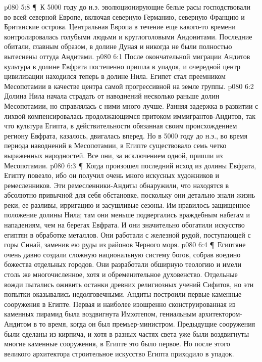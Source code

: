 \vs p080 5:8 \P\ К 5000 году до н.э. эволюционирующие белые расы господствовали во всей северной Европе, включая северную Германию, северную Францию и Британские острова. Центральная Европа в течение еще какого\hyp{}то времени контролировалась голубыми людьми и круглоголовыми Андонитами. Последние обитали, главным образом, в долине Дуная и никогда не были полностью вытеснены оттуда Андитами.
\vs p080 6:1 После окончательной миграции Андитов культура в долине Евфрата постепенно пришла в упадок, и очередной центр цивилизации находился теперь в долине Нила. Египет стал преемником Месопотамии в качестве центра самой прогрессивной на земле группы.
\vs p080 6:2 Долина Нила начала страдать от наводнений несколько раньше долин Месопотамии, но справлялась с ними много лучше. Ранняя задержка в развитии с лихвой компенсировалась продолжающимся притоком иммигрантов\hyp{}Андитов, так что культура Египта, в действительности обязанная своим происхождением региону Евфрата, казалось, двигалась вперед. Но в 5000 году до н.э., во время периода наводнений в Месопотамии, в Египте существовало семь четко выраженных народностей. Все они, за исключением одной, пришли из Месопотамии.
\vs p080 6:3 \P\ Когда произошел последний исход из долины Евфрата, Египту повезло, ибо он получил очень много искусных художников и ремесленников. Эти ремесленники\hyp{}Андиты обнаружили, что находятся в абсолютно привычной для себя обстановке, поскольку они детально знали жизнь реки, ее разливы, ирригацию и засушливые сезоны. Им нравилось защищенное положение долины Нила; там они меньше подвергались враждебным набегам и нападениям, чем на берегах Евфрата. И они значительно обогатили искусство египтян в обработке металлов. Они работали с железной рудой, поступающей с горы Синай, заменив ею руды из районов Черного моря.
\vs p080 6:4 \P\ Египтяне очень давно создали сложную национальную систему богов, собрав воедино божества отдельных городов. Они разработали обширную теологию и имели столь же многочисленное, хотя и обременительное духовенство. Отдельные вожди пытались оживить останки древних религиозных учений Сифитов, но эти попытки оказывались недолговечными. Андиты построили первые каменные сооружения в Египте. Первая и наиболее изошренно сконструированная из каменных пирамид была воздвигнута Имхотепом, гениальным архитектором\hyp{}Андитом в то время, когда он был премьер\hyp{}министром. Предыдущие сооружения были сделаны из кирпича, и хотя в разных частях света уже были воздвигнуты многие каменные сооружения, в Египте это было первое. Но после этого великого архитектора строительное искусство Египта приходило в упадок.
